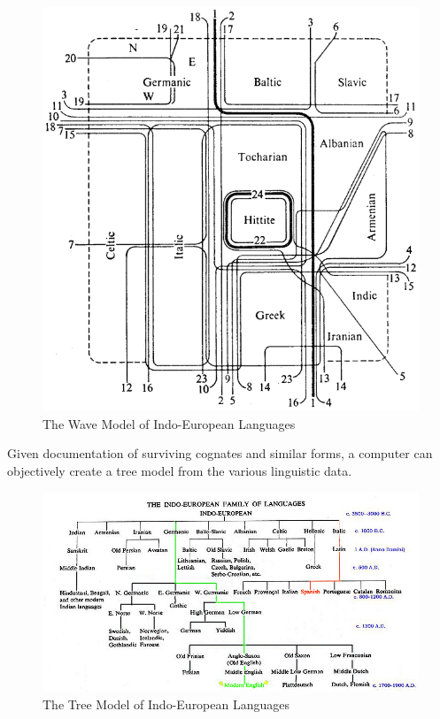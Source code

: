 \documentclass{exam}
\begin{document}
\begin{figure}[h!]
\centering
\includegraphics[scale=.6]{images/Indo.jpg}
\caption{The Wave Model of Indo-European Languages}
\label{fig:download}
\end{figure}

Given documentation of surviving cognates and similar forms, a computer can objectively create a tree model from the various linguistic data. 

\begin{figure}[h!]
\centering
\includegraphics[scale=.6]{images/treemodel.jpg}
\caption{The Tree Model of Indo-European Languages}
\label{fig:download}
\end{figure}
\end{document}
